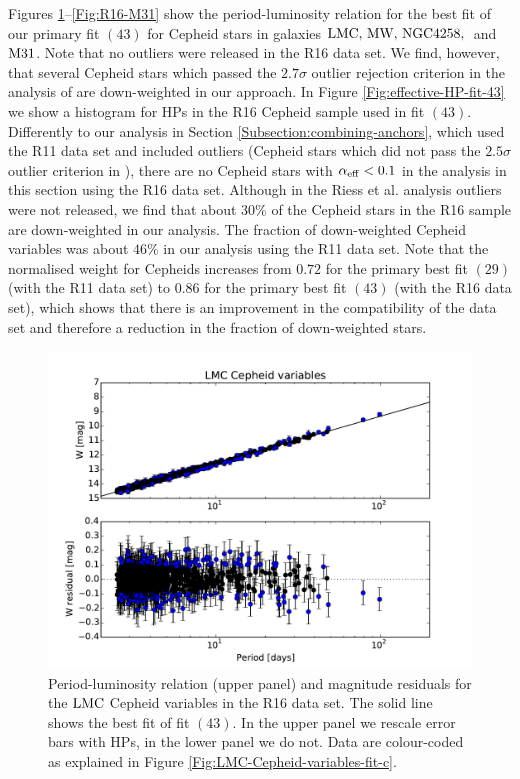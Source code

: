 Figures \ref{Fig:R16-LMC}--\ref{Fig:R16-M31} show the period-luminosity relation for the best fit of our primary fit $(43)$ for Cepheid stars in galaxies $\mathrm{LMC},\, \mathrm{MW},\, \mathrm{NGC4258},\,$ and $\mathrm{M31}$. Note that no outliers were released in the R16 data set. We find, however, that several Cepheid stars which passed the $2.7\sigma$ outlier rejection criterion in the analysis of \cite{Riess:2016jrr} are down-weighted in our approach. In Figure \ref{Fig:effective-HP-fit-43} we show a histogram for HPs in the R16 Cepheid sample used in fit $(43)$. Differently to our analysis in Section \ref{Subsection:combining-anchors}, which used the R11 data set and included outliers (Cepheid stars which did not pass the $2.5\sigma$ outlier criterion in \cite{Riess:2011yx}), there are no Cepheid stars with $\alpha_{\mathrm{eff}}<0.1$ in the analysis in this section using the R16 data set. Although in the Riess et al. analysis \cite{Riess:2016jrr} outliers  were not released, we find that about $30\%$ of the Cepheid stars in the R16 sample are down-weighted in our analysis. The fraction of down-weighted Cepheid variables was about $46\%$ in our analysis using the R11 data set. Note that the normalised weight for Cepheids increases from $0.72$ for the primary best fit $(29)$ (with the R11 data set) to $0.86$ for the primary best fit $(43)$ (with the R16 data set), which shows that there is an improvement in the compatibility of the data set and therefore a reduction in the fraction of down-weighted stars.    

\begin{figure}[hbtp]
\centering
\includegraphics[width=\textwidth]{figures/chapter-h0/effective_HP_cepheids_LMC_R16.pdf}
\caption{Period-luminosity relation (upper panel) and magnitude residuals for the $\mathrm{LMC}$ Cepheid variables in the R16 data set. The solid line shows the best fit of fit $(43)$. In the upper panel we rescale error bars with HPs, in the lower panel we do not. Data are colour-coded as explained in Figure \ref{Fig:LMC-Cepheid-variables-fit-c}.}
\label{Fig:R16-LMC}
\end{figure}
  
